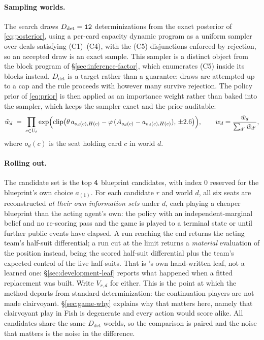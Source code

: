 \paragraph{Sampling worlds.} The search draws $D_{\mathrm{det}} = \texttt{12{}}$
determinizations from the exact posterior of \eqref{eq:posterior}, using a per-card capacity dynamic program as a uniform sampler over deals
satisfying (C1)--(C4), with the (C5) disjunctions enforced by rejection, so an accepted draw is an
exact sample. This sampler is a distinct object from the block program of \S\ref{sec:inference-factor},
which enumerates (C5) inside its blocks instead. $D_{\mathrm{det}}$ is a target rather than a
guarantee: draws are attempted up to a cap and the rule proceeds with however many survive
rejection. The policy prior of \eqref{eq:prior} is then applied as an
importance weight rather than baked into the sampler, which keeps the sampler exact and the prior
auditable:
\begin{equation}
  \tilde w_d \;=\; \prod_{c \in U_t} \exp\Bigl(\operatorname{clip}\bigl(\theta\, a_{o_d(c),H(c)}
  - \varphi\,(A_{o_d(c)} - a_{o_d(c),H(c)}),\, \pm 2.6\bigr)\Bigr),
  \qquad
  w_d = \frac{\tilde w_d}{\sum_{d'} \tilde w_{d'}},
  \label{eq:iw}
\end{equation}
where $o_d(c)$ is the seat holding card $c$ in world $d$.

\paragraph{Rolling out.} The candidate set is the top $\texttt{4{}}$ blueprint
candidates, with index $0$ reserved for the blueprint's own choice $a_{(1)}$. For each candidate $r$ and world $d$, all six seats are reconstructed \emph{at their own information
sets} under $d$, each playing a cheaper blueprint than the acting agent's own: the \vfive{} policy
with an independent-marginal belief and no re-scoring pass and the game is played to a terminal state or until \texttt{\vsevenOptDepth{}} further public events
have elapsed. A run reaching the end returns the acting team's half-suit differential; a run cut at the limit
returns a \emph{material} evaluation of the position instead, being the scored half-suit differential
plus the team's expected control of the live half-suits. That is \vsix{}'s own hand-written leaf, not
a learned one: \S\ref{sec:development-leaf} reports what happened when a fitted replacement was
built. Write $V_{r,d}$ for either. This is the point at which the method departs from standard
determinization: the continuation players are not made clairvoyant. \S\ref{sec:game-why} explains why
that matters here, namely that clairvoyant play in Fish is degenerate and every action would score
alike. All candidates share the same $D_{\mathrm{det}}$ worlds, so the comparison is paired and the
noise that matters is the noise in the difference.

